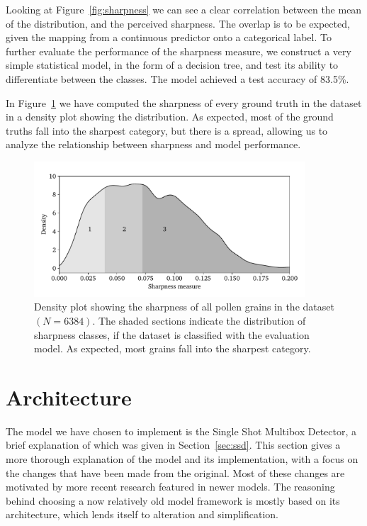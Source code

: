 Looking at Figure~\ref{fig:sharpness} we can see a clear correlation between the mean of the distribution, and the perceived sharpness.
The overlap is to be expected, given the mapping from a continuous predictor onto a categorical label.
To further evaluate the performance of the sharpness measure, we construct a very simple statistical model, in the form of a decision tree, and test its ability to differentiate between the classes.
The model achieved a test accuracy of 83.5\%. 

In Figure~\ref{fig:sharpness-all} we have computed the sharpness of every ground truth in the dataset in a density plot showing the distribution.
As expected, most of the ground truths fall into the sharpest category, but there is a spread, allowing us to analyze the relationship between sharpness and model performance.

\begin{figure}[htbp]
  \centering
  \includegraphics[width=0.9\textwidth]{figs/sharpness_all.pdf}
  \caption[Distribution of sharpness across entire dataset]{Density plot showing the sharpness of all pollen grains in the dataset \((N=6384)\). The shaded sections indicate the distribution of sharpness classes, if the dataset is classified with the evaluation model. As expected, most grains fall into the sharpest category.}\label{fig:sharpness-all}
\end{figure}

\section{Architecture}\label{sec:method-arch}

The model we have chosen to implement is the Single Shot Multibox Detector, a brief explanation of which was given in Section~\ref{sec:ssd}.
This section gives a more thorough explanation of the model and its implementation, with a focus on the changes that have been made from the original.
Most of these changes are motivated by more recent research featured in newer models.
The reasoning behind choosing a now relatively old model framework is mostly based on its architecture, which lends itself to alteration and simplification.


